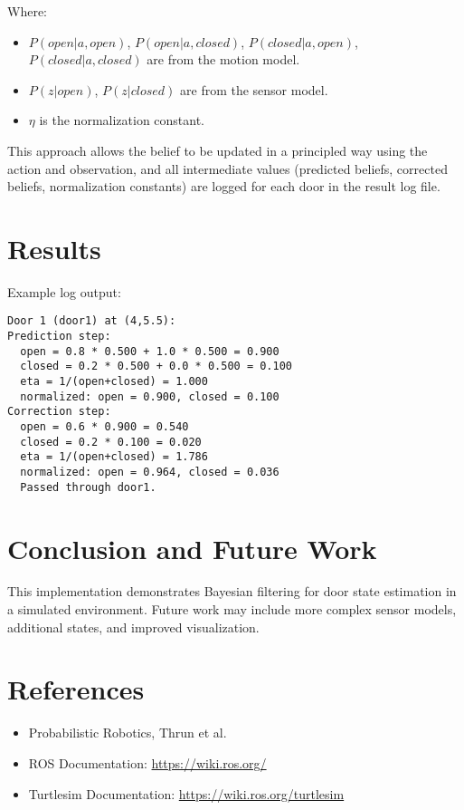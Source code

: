 \documentclass[12pt]{article}
\begin{document}
Where:
\begin{itemize}
  \item $P(open|a,open)$, $P(open|a,closed)$, $P(closed|a,open)$, $P(closed|a,closed)$ are from the motion model.
  \item $P(z|open)$, $P(z|closed)$ are from the sensor model.
  \item $\eta$ is the normalization constant.
\end{itemize}

This approach allows the belief to be updated in a principled way using the action and observation, and all intermediate values (predicted beliefs, corrected beliefs, normalization constants) are logged for each door in the result log file.
\section{Results}
Example log output:
\begin{verbatim}
Door 1 (door1) at (4,5.5):
Prediction step:
  open = 0.8 * 0.500 + 1.0 * 0.500 = 0.900
  closed = 0.2 * 0.500 + 0.0 * 0.500 = 0.100
  eta = 1/(open+closed) = 1.000
  normalized: open = 0.900, closed = 0.100
Correction step:
  open = 0.6 * 0.900 = 0.540
  closed = 0.2 * 0.100 = 0.020
  eta = 1/(open+closed) = 1.786
  normalized: open = 0.964, closed = 0.036
  Passed through door1.
\end{verbatim}
\section{Conclusion and Future Work}
This implementation demonstrates Bayesian filtering for door state estimation in a simulated environment. Future work may include more complex sensor models, additional states, and improved visualization.
\section{References}
\begin{itemize}
  \item Probabilistic Robotics, Thrun et al.
  \item ROS Documentation: \url{https://wiki.ros.org/}
  \item Turtlesim Documentation: \url{https://wiki.ros.org/turtlesim}
\end{itemize}
\end{document}
